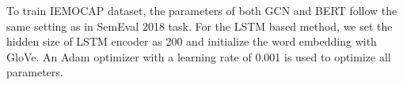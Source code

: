 \documentclass[11pt,a4paper]{article}
\begin{document}
To train IEMOCAP dataset, the parameters of both GCN and BERT follow the same setting as in SemEval 2018 task. For the LSTM based method, we set the hidden size of LSTM encoder as 200 and initialize the word embedding with GloVe. An Adam optimizer with a learning rate of 0.001 is used to optimize all parameters.

\begin{table}[t]
\centering
{}
\caption{Percentage of tweets that are labeled with a given emotion in the SemEval-2018 Task 1 dataset.}
\label{table:semeval_data}
\end{table}
\end{document}
